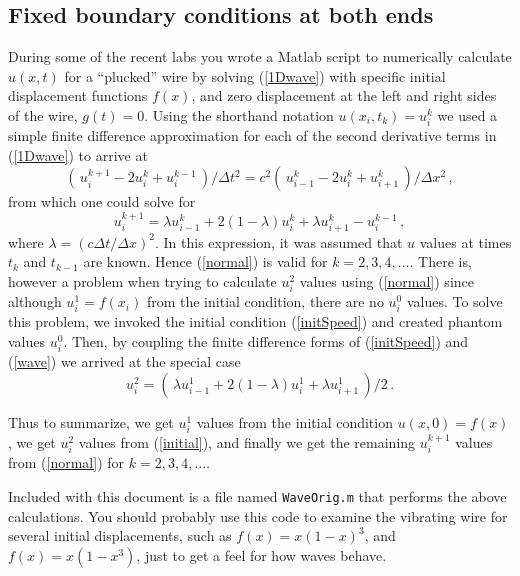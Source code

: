 \documentclass[11pt]{article}
\begin{document}

\subsection{Fixed boundary conditions at both ends}
During some of the recent labs
you wrote a Matlab script to numerically calculate
$u(x,t)$ for a ``plucked'' wire by solving (\ref{1Dwave})
with specific initial displacement functions $f(x)$, and
zero displacement at the left and right sides of the wire, $g(t) = 0$.
Using the shorthand notation $u(x_i, t_k) = u_i^k$
we used a simple finite difference approximation for each of the
second derivative terms in (\ref{1Dwave}) to arrive at
\begin{equation}
( \, u_i^{k+1} - 2u_i^k + u_i^{k-1} \, ) / \Delta t^2
   = c^2 ( \, u_{i-1}^k - 2u_i^k + u_{i+1}^k \, ) / \Delta x^2 \, ,
                                                         \label{wave}
\end{equation}
from which one could solve for
\begin{equation}
u_i^{k+1} = \lambda u_{i-1}^k + 2(1-\lambda) u_i^k + \lambda u_{i+1}^k
             - u_i^{k-1}  \,,    \label{normal}
\end{equation}
where $\lambda = ( c \Delta t / \Delta x )^2$.
In this expression, it was assumed that $u$ values at times $t_k$ and
$t_{k-1}$ are known. Hence (\ref{normal}) is valid for $k = 2, 3, 4, \ldots$.
There is, however a problem when trying to calculate $u_i^2$ values
using (\ref{normal}) since although $u_i^1 = f(x_i)$ from the
initial condition,
there are no $u_i^0$ values. To solve this problem, we invoked the
initial condition (\ref{initSpeed}) and created phantom values $u_i^0$.
Then, by coupling the finite difference forms of (\ref{initSpeed})
and (\ref{wave}) we arrived at the special case
\begin{equation}
u_i^2 = ( \, \lambda u_{i-1}^1 + 2(1-\lambda) u_i^1 + \lambda u_{i+1}^1
             \,) / 2 \,.    \label{initial}
\end{equation}

Thus to summarize, we get $u_i^1$ values from the initial condition
$u(x,0) = f(x)$,
we get $u_i^2$ values from (\ref{initial}), and finally we get the
remaining $u_i^{k+1}$ values from (\ref{normal}) for $k = 2, 3, 4, \ldots$. 

Included with this document is a file named {\tt WaveOrig.m} that
performs the above calculations. You should probably use
this code to examine the vibrating wire for several
initial displacements, such as $f(x) = x ( 1-x )^3$, and
$f(x) = x ( 1-x^3 )$, just to get a feel for how waves behave. 
\end{document}
